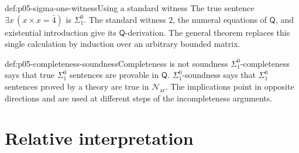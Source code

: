 \begin{hbexample}{def:p05-sigma-one-witness}{Using a standard witness}
The true sentence \(\exists x\,(x\times x=\bar4)\) is
\(\Sigma^0_1\).  The standard witness \(2\), the numeral equations of
\(\mathsf Q\), and existential introduction give its
\(\mathsf Q\)-derivation.  The general theorem replaces this single
calculation by induction over an arbitrary bounded matrix.
\end{hbexample}

\begin{hbwarning}{def:p05-completeness-soundness}{Completeness is not soundness}
\(\Sigma^0_1\)-completeness says that true \(\Sigma^0_1\) sentences are
provable in \(\mathsf Q\).  \(\Sigma^0_1\)-soundness says that
\(\Sigma^0_1\) sentences proved by a theory are true in
\(\mathcal N_{\mathrm{ar}}\).  The implications point in opposite
directions and are used at different steps of the incompleteness arguments.
\end{hbwarning}

\section{Relative interpretation}

